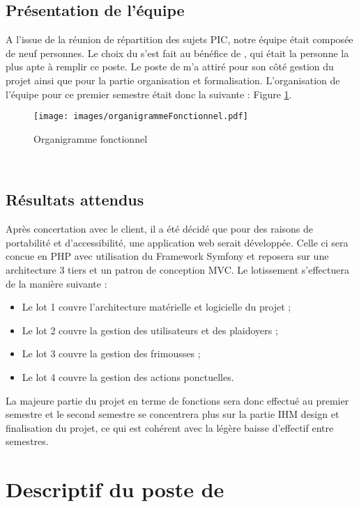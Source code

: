 \documentclass[asi]{picInsa}
\begin{document}
\section{Présentation de l'équipe}
A l’issue de la réunion de répartition des sujets PIC, notre équipe était composée de
neuf personnes. Le choix du \CP{} s’est fait au bénéfice de \Sergi{}, qui était la personne la plus apte à remplir ce poste.
Le poste de \RQ{} m'a attiré pour son côté gestion du projet ainsi que pour la partie organisation et formalisation.
L’organisation de l’équipe pour ce premier semestre était donc la suivante : Figure \ref{organigramme}.

\begin{figure}[H]
	\texttt{[image: images/organigrammeFonctionnel.pdf]}
	\caption{Organigramme fonctionnel}
	\label{organigramme}
\end{figure}
~\\


\section{Résultats attendus}
Après concertation avec le client, il a été décidé que pour des raisons de portabilité et d'accessibilité, une application web serait développée. Celle ci sera concue en PHP avec utilisation du Framework Symfony et reposera sur une architecture 3 tiers et un patron de conception MVC. Le lotissement s’effectuera de la manière suivante :
\begin{itemize}
\item Le lot 1 couvre l'architecture matérielle et logicielle du projet ;
\item Le lot 2 couvre la gestion des utilisateurs et des plaidoyers ;
\item Le lot 3 couvre la gestion des frimousses ;
\item Le lot 4 couvre la gestion des actions ponctuelles.
\end{itemize}

La majeure partie du projet en terme de fonctions sera donc effectué au premier semestre et le second semestre se concentrera plus sur la partie IHM design et finalisation du projet, ce qui est cohérent avec la légère baisse d’effectif entre semestres.


\chapter{Descriptif du poste de \RQ}
\label{Descriptif}
\end{document}
